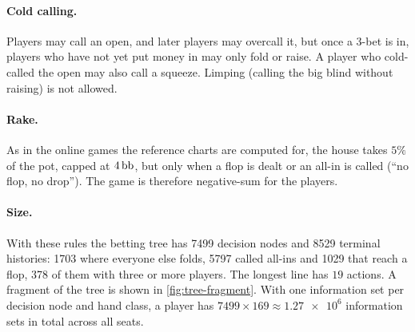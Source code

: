 \paragraph{Cold calling.} Players may call an open, and later players may overcall it, but once a 3-bet is in, players who have not yet put money in may only fold or raise. A player who cold-called the open may also call a squeeze. Limping (calling the big blind without raising) is not allowed.

\paragraph{Rake.} As in the online games the reference charts are computed for, the house takes $5\%$ of the pot, capped at $4\,\mathrm{bb}$, but only when a flop is dealt or an all-in is called (\enquote{no flop, no drop}). The game is therefore negative-sum for the players.

\paragraph{Size.} With these rules the betting tree has \num{7499} decision nodes and \num{8529} terminal histories: \num{1703} where everyone else folds, \num{5797} called all-ins and \num{1029} that reach a flop, \num{378} of them with three or more players. The longest line has $19$ actions. A fragment of the tree is shown in \cref{fig:tree-fragment}. With one information set per decision node and hand class, a player has $\num{7499}\times 169 \approx \num{1.27e6}$ information sets in total across all seats.

